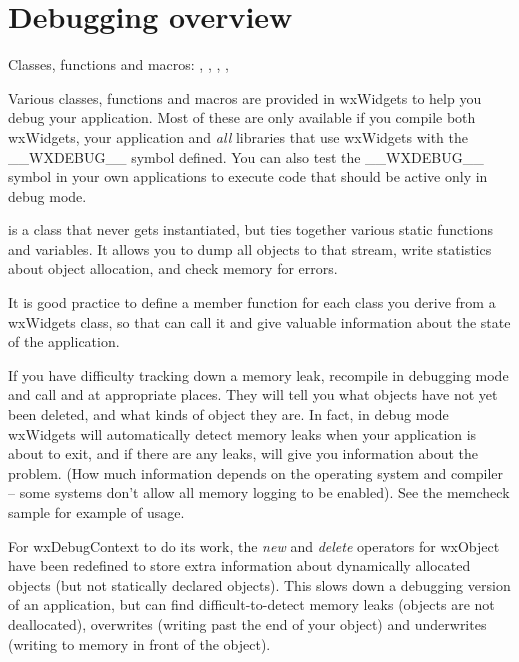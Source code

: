 \section{Debugging overview}\label{debuggingoverview}

Classes, functions and macros: , , ,
\rtfsp{}, 

Various classes, functions and macros are provided in wxWidgets to help you debug
your application. Most of these are only available if you compile both wxWidgets,
your application and {\it all} libraries that use wxWidgets with the \_\_WXDEBUG\_\_ symbol
defined. You can also test the \_\_WXDEBUG\_\_ symbol in your own applications to execute
code that should be active only in debug mode.


 is a class that never gets instantiated, but ties together
various static functions and variables. It allows you to dump all objects to that stream, write statistics about object allocation, and
check memory for errors.

It is good practice to define a  member function for each class you derive
from a wxWidgets class, so that  can call it and
give valuable information about the state of the application.

If you have difficulty tracking down a memory leak, recompile
in debugging mode and call  and  at
appropriate places. They will tell you what objects have not yet been
deleted, and what kinds of object they are. In fact, in debug mode wxWidgets will automatically
detect memory leaks when your application is about to exit, and if there are any leaks,
will give you information about the problem. (How much information depends on the operating system
and compiler -- some systems don't allow all memory logging to be enabled). See the
memcheck sample for example of usage.

For wxDebugContext to do its work, the {\it new} and {\it delete}\rtfsp
operators for wxObject have been redefined to store extra information
about dynamically allocated objects (but not statically declared
objects). This slows down a debugging version of an application, but can
find difficult-to-detect memory leaks (objects are not
deallocated), overwrites (writing past the end of your object) and
underwrites (writing to memory in front of the object).

